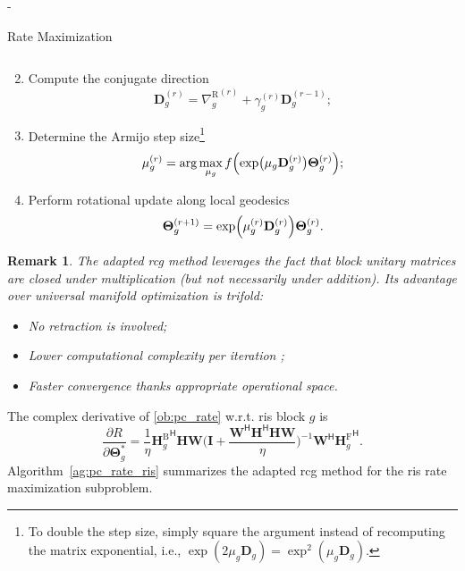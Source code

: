 \documentclass[journal]{IEEEtran}
\newtheorem{remark}{Remark}
\begin{document}
\begin{section}{-}
\begin{subsection}{Rate Maximization}
\begin{enumerate}
\begin{equation}
				\label{eq:rcg_weight}
			\end{equation}
			\item Compute the conjugate direction
			\begin{equation}
				\mathbf{D}_g^{(r)} = {\nabla_g^\mathrm{R}}^{(r)} + \gamma_g^{(r)} \mathbf{D}_g^{(r-1)};
				\label{eq:rcg_direction}
			\end{equation}
			\item Determine the Armijo step size\footnote{To double the step size, simply square the argument instead of recomputing the matrix exponential, i.e., $\exp(2 \mu_g \mathbf{D}_g) = \exp^2(\mu_g \mathbf{D}_g)$.}
			\begin{equation}
				\mu_g^{(r)} = \arg\max_{\mu_g} f\Bigl(\exp\bigl(\mu_g \mathbf{D}_g^{(r)}\bigr) \mathbf{\Theta}_g^{(r)}\Bigr);
				\label{eq:rcg_step}
			\end{equation}
			\item Perform rotational update along local geodesics
			\begin{equation}
				\mathbf{\Theta}_g^{(r+1)} = \exp\Bigl(\mu_g^{(r)} \mathbf{D}_g^{(r)}\Bigr) \mathbf{\Theta}_g^{(r)}.
				\label{eq:rcg_update}
			\end{equation}
		\end{enumerate}

		\begin{remark}
			The adapted \gls{rcg} method leverages the fact that block unitary matrices are closed under multiplication (but not necessarily under addition).
			Its advantage over universal manifold optimization \cite{Absil2009,Pan2022d} is trifold:
			\begin{itemize}
				\item No retraction is involved;
				\item Lower computational complexity per iteration \cite{Abrudan2008};
				\item Faster convergence thanks appropriate operational space.
			\end{itemize}
		\end{remark}

		The complex derivative of \eqref{ob:pc_rate} w.r.t. \gls{ris} block $g$ is
		\begin{equation}
			\frac{\partial R}{\partial \mathbf{\Theta}_g^*} = \frac{1}{\eta} {\mathbf{H}_g^\mathrm{B}}^\mathsf{H} \mathbf{HW} \biggl(\mathbf{I} + \frac{\mathbf{W}^\mathsf{H}\mathbf{H}^\mathsf{H}\mathbf{H}\mathbf{W}}{\eta}\biggr)^{-1} \mathbf{W}^\mathsf{H} {\mathbf{H}_g^\mathrm{F}}^\mathsf{H}.
			\label{eq:pc_rate_gradient_ris}
		\end{equation}
		Algorithm~\ref{ag:pc_rate_ris} summarizes the adapted \gls{rcg} method for the \gls{ris} rate maximization subproblem.


\end{subsection}
\end{section}
\end{document}
